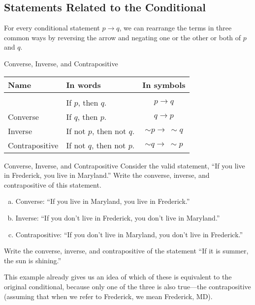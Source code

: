 \subsection{Statements Related to the Conditional}
For every conditional statement $p \to q$, we can rearrange the terms in three common ways by reversing the arrow and negating one or the other or both of $p$ and $q$.

\begin{proc}{Converse, Inverse, and Contrapositive}
\begin{tabular}{l l c}
Name & In words & In symbols\\
\hline
& & \\
 & If $p$, then $q$. & $p \to q$\\
Converse & If $q$, then $p$. & $q \to p$\\
Inverse & If not $p$, then not $q$. & $\sim p \to\ \sim q$\\
Contrapositive & If not $q$, then not $p$. & $\sim q \to\ \sim p$
\end{tabular}
\end{proc}

\begin{example}[https://www.youtube.com/watch?v=GDE6Yg22DUk]{Converse, Inverse, and Contrapositive}
Consider the valid statement, ``If you live in Frederick, you live in Maryland.''  Write the converse, inverse, and contrapositive of this statement.

\sol
\begin{enumerate}[(a)]
\item Converse: ``If you live in Maryland, you live in Frederick.''
\item Inverse: ``If you don't live in Frederick, you don't live in Maryland.''
\item Contrapositive: ``If you don't live in Maryland, you don't live in Frederick.''
\end{enumerate}
\end{example}

\begin{try}
Write the converse, inverse, and contrapositive of the statement ``If it is summer, the sun is shining.''
\end{try}

This example already gives us an idea of which of these is equivalent to the original conditional, because only one of the three is also true---the contrapositive (assuming that when we refer to Frederick, we mean Frederick, MD).

